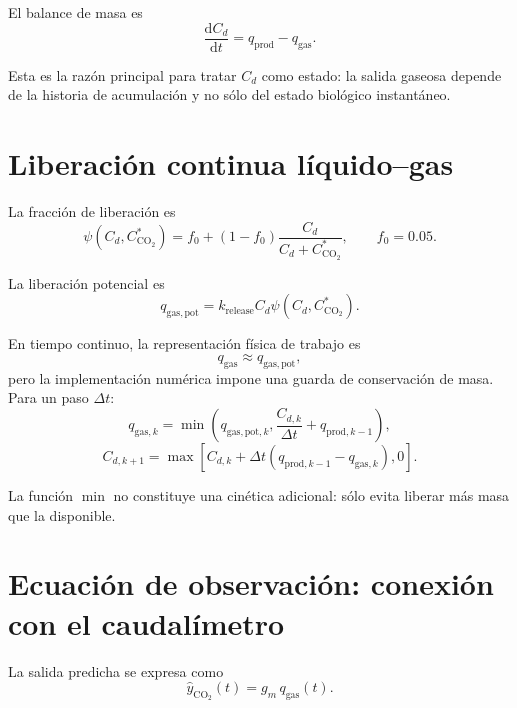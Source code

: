 \documentclass[11pt,a4paper]{article}
\newcommand{\COtwo}{\mathrm{CO_2}}
\newcommand{\dd}{\mathrm{d}}
\begin{document}
El balance de masa es
\begin{equation}
\boxed{
\frac{\dd C_d}{\dd t}
=
q_{\mathrm{prod}}-q_{\mathrm{gas}}.
}
\label{eq:cdode}
\end{equation}

Esta es la razón principal para tratar $C_d$ como estado: la salida gaseosa depende de la historia
de acumulación y no sólo del estado biológico instantáneo.

\section{Liberación continua líquido--gas}

La fracción de liberación es
\begin{equation}
\psi(C_d,C_{\COtwo}^{\ast})
=
f_0
+
(1-f_0)
\frac{C_d}{C_d+C_{\COtwo}^{\ast}},
\qquad
f_0=0.05.
\label{eq:psi}
\end{equation}

La liberación potencial es
\begin{equation}
\boxed{
q_{\mathrm{gas,pot}}
=
k_{\mathrm{release}}
C_d
\psi(C_d,C_{\COtwo}^{\ast}).
}
\label{eq:qgaspot}
\end{equation}

En tiempo continuo, la representación física de trabajo es
\[
q_{\mathrm{gas}}\approx q_{\mathrm{gas,pot}},
\]
pero la implementación numérica impone una guarda de conservación de masa. Para un paso
$\Delta t$:
\begin{equation}
q_{\mathrm{gas},k}
=
\min\left(
q_{\mathrm{gas,pot},k},
\frac{C_{d,k}}{\Delta t}
+
q_{\mathrm{prod},k-1}
\right),
\label{eq:qgasguard}
\end{equation}
\begin{equation}
C_{d,k+1}
=
\max\left[
C_{d,k}
+
\Delta t
(q_{\mathrm{prod},k-1}-q_{\mathrm{gas},k}),
0
\right].
\label{eq:cd_discrete}
\end{equation}

La función $\min$ no constituye una cinética adicional: sólo evita liberar más masa que la
disponible.

\section{Ecuación de observación: conexión con el caudalímetro}

La salida predicha se expresa como
\begin{equation}
\boxed{
\widehat y_{\COtwo}(t)
=
g_m\,q_{\mathrm{gas}}(t).
}
\label{eq:measurement}
\end{equation}
\end{document}
